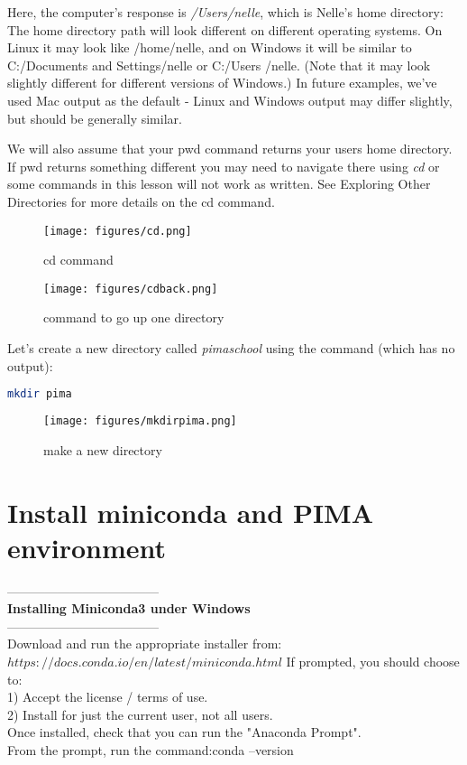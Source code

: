 \documentclass[11pt]{book}
\begin{document}
Here, the computer’s response is \emph{/Users/nelle}, which is Nelle’s home directory:
The home directory path will look different on different operating systems. On Linux it may look like /home/nelle, and on Windows it will be similar to C:\slash Documents and Settings\slash nelle or C:\slash Users \slash nelle. (Note that it may look slightly different for different versions of Windows.) In future examples, we’ve used Mac output as the default - Linux and Windows output may differ slightly, but should be generally similar.

We will also assume that your pwd command returns your users home directory. If pwd returns something different you may need to navigate there using \emph{cd} or some commands in this lesson will not work as written. 
See Exploring Other Directories for more details on the cd command.

\begin{figure}[!]
\texttt{[image: figures/cd.png]}
\caption{cd command}
\end{figure}


\begin{figure}[!]
\texttt{[image: figures/cdback.png]}
\caption{command to go up one directory}
\end{figure}


Let’s create a new directory called \emph{pimaschool} using the command (which has no output):
\begin{lstlisting}[language=bash]
mkdir pima 
\end{lstlisting}

\begin{figure}[!]
\texttt{[image: figures/mkdirpima.png]}
\caption{make a new directory}
\end{figure}

\section{Install miniconda and PIMA environment } 
------------------------------------ \\
{\bf Installing Miniconda3 under Windows} \\
------------------------------------ \\
Download and run the appropriate installer from: \\
$https://docs.conda.io/en/latest/miniconda.html$
If prompted, you should choose to:\\
1)  Accept the license / terms of use.\\
2)  Install for just the current user, not all users.\\
Once installed, check that you can run the "Anaconda Prompt".  \\
From the prompt, run the command:conda --version\\
\end{document}
